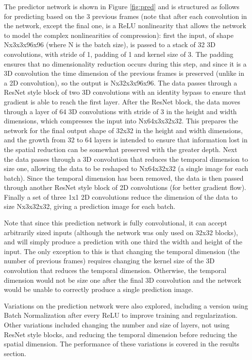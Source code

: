 \documentclass[10pt,twocolumn,letterpaper]{article}
\begin{document}
The predictor network is shown in Figure \ref{fig:pred} and is structured as follows for predicting based on the $3$ previous frames (note that after each convolution in the network, except the final one, is a ReLU nonlinearity that allows the network to model the complex nonlinearities of compression): first the input, of shape Nx3x3x96x96 (where N is the batch size), is passed to a stack of 32 3D convolutions, with stride of 1, padding of 1 and kernel size of 3. The padding ensures that no dimensionality reduction occurs during this step, and since it is a 3D convolution the time dimension of the previous frames is preserved (unlike in a 2D convolution), so the output is Nx32x3x96x96. The data passes through a ResNet \cite{DBLP:journals/corr/HeZRS15} style block of two 3D convolutions with an identity bypass to ensure that gradient is able to reach the first layer. After the ResNet block, the data moves through a layer of 64 3D convolutions with stride of 3 in the height and width dimensions, which compresses the input into Nx64x3x32x32. This prepares the network for the final output shape of 32x32 in the height and width dimensions, and the growth from 32 to 64 layers is intended to ensure that information lost in the spatial reduction can be somewhat preserved with the greater depth. Next the data passes through a 3D convolution that reduces the temporal dimension to size one, allowing the data to be reshaped to Nx64x32x32 (a single image for each batch). Since the temporal dimension has been removed, the data is then passed through another ResNet style block of 2D convolutions (for better gradient flow). Finally a set of three 1x1 2D convolutions reduce the dimension of the data to size Nx3x32x32, giving a prediction image for each batch. 

  Note that since this prediction network is fully convolutional, it can accept arbitrarily sized inputs (although the network was only used on 32x32 blocks), and will simply produce a prediction with one third the width and height of the input. The only exception to this is that changing the temporal dimension (the number of previous frames) requires changing the kernel size of the 3D convolution that reduces the temporal dimension. Otherwise, the temporal dimension would not be size one after the final 3D convolution and the network would be unable to correctly produce a single prediction image. 
  
  Variations on the prediction network were also explored, including a version using Batch Normalization \cite{DBLP:journals/corr/IoffeS15} after every ReLU to improve training and regularization. Other variations included changing the number and size of layers, not using ResNet style blocks, and reducing the temporal dimension before reducing the spatial dimension. The performance of these variations is covered in the results section.
\end{document}
